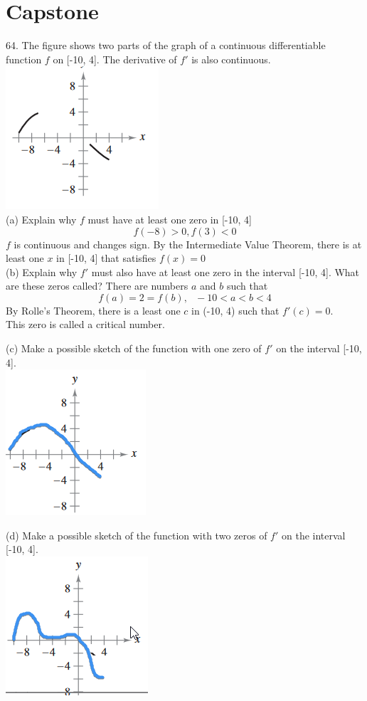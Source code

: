 \documentclass[11pt]{article}
\begin{document}
\section{Capstone}
64. The figure shows two parts of the graph of a continuous differentiable function $f$ on [-10, 4]. The derivative of $f'$ is also continuous.\\
\includegraphics{64.png}\\
(a) Explain why $f$ must have at least one zero in [-10, 4]
\[f(-8)>0, f(3)<0\]
$f$ is continuous and changes sign. By the Intermediate Value Theorem, there is at least one $x$ in [-10, 4] that satisfies $f(x)=0$\\

\vspace{1cm}
\noindent
(b) Explain why $f'$ must also have at least one zero in the interval [-10, 4]. What are these zeros called?
There are numbers $a$ and $b$ such that
\[f(a)=2=f(b),\,\,\,\,-10<a<b<4\]
By Rolle's Theorem, there is a least one $c$ in (-10, 4) such that $f'(c)=0$.\\
This zero is called a critical number.

\vspace{1cm}
\noindent
(c) Make a possible sketch of the function with one zero of $f'$ on the interval [-10, 4].\\
\includegraphics{64b.png}

\vspace{1cm}
\noindent
(d) Make a possible sketch of the function with two zeros of $f'$ on the interval [-10, 4].\\
\includegraphics{64c.png}
\end{document}
